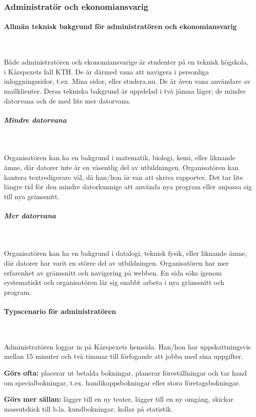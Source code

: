 \documentclass[a4paper, twoside, 11pt, titlepage]{article}
\begin{document}
		\subsubsection{Administratör och ekonomiansvarig}



			\paragraph{Allmän teknisk bakgrund för administratören och ekonomiansvarig}\

			Både administratören och ekonomiansvarige är studenter på en teknisk högskola, i Kårspexets fall KTH. De är därmed vana att navigera i personliga inloggningssidor, t.ex. Mina sidor, eller studera.nu. De är även vana användare av mailklienter. Deras tekniska bakgrund är uppdelad i två jämna läger; de mindre datorvana och de med lite mer datorvana.

			\subparagraph{\emph{Mindre datorvana}}\

				Organisatören kan ha en bakgrund i matematik, biologi, kemi, eller liknande ämne, där datorer inte är en väsentlig del av utbildningen. Organisatören kan hantera textredigerare väl, då han/hon är van att skriva rapporter. Det tar lite längre tid för den mindre datorkunnige att använda nya program eller anpassa sig till nya gränssnitt.

			\subparagraph{\emph{Mer datorvana}}\

				Organisatören kan ha en bakgrund i datalogi, teknisk fysik, eller liknande ämne, där datorer har varit en större del av utbildningen. Organisatören har mer erfarenhet av gränssnitt och navigering på webben. En sida söks igenom systematiskt och organisatören lär sig snabbt arbeta i nya gränssnitt och program.

			\paragraph{Typscenario för administratören}\

			Administratören loggar in på Kårspexets hemsida. Han/hon har uppskattningsvis mellan 15 minuter och två timmar till förfogande att jobba med sina uppgifter. 

			\textbf{Görs ofta:} placerar ut betalda bokningar, planerar föreställningar och tar hand om specialbokningar, t.ex. handikappsbokningar eller stora företagsbokningar. 

			\textbf{Görs mer sällan:} lägger till en ny teater, lägger till en ny omgång, skickar massutskick till b.la. kundbokningar, kollar på statistik.
\end{document}

